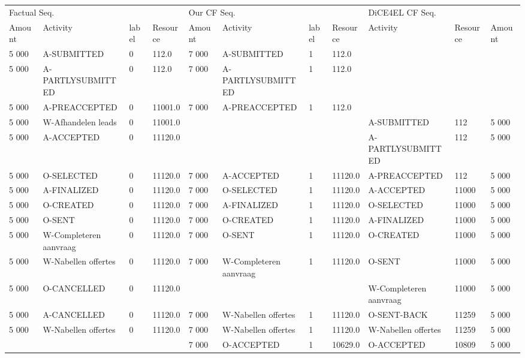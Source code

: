 \begin{tabular}{lllllllllll}
\toprule
\multicolumn{4}{l}{Factual Seq.} & \multicolumn{4}{l}{Our CF Seq.} & \multicolumn{3}{l}{DiCE4EL CF Seq.} \\
Amount & Activity & label & Resource & Amount & Activity & label & Resource & Activity & Resource & Amount \\
\midrule
5 000 & A-SUBMITTED & 0 & 112.0 & 7 000 & A-SUBMITTED & 1 & 112.0 &  &  &  \\
5 000 & A-PARTLYSUBMITTED & 0 & 112.0 & 7 000 & A-PARTLYSUBMITTED & 1 & 112.0 &  &  &  \\
5 000 & A-PREACCEPTED & 0 & 11001.0 & 7 000 & A-PREACCEPTED & 1 & 112.0 &  &  &  \\
5 000 & W-Afhandelen leads & 0 & 11001.0 &  &  &  &  & A-SUBMITTED & 112 & 5 000 \\
5 000 & A-ACCEPTED & 0 & 11120.0 &  &  &  &  & A-PARTLYSUBMITTED & 112 & 5 000 \\
5 000 & O-SELECTED & 0 & 11120.0 & 7 000 & A-ACCEPTED & 1 & 11120.0 & A-PREACCEPTED & 112 & 5 000 \\
5 000 & A-FINALIZED & 0 & 11120.0 & 7 000 & O-SELECTED & 1 & 11120.0 & A-ACCEPTED & 11000 & 5 000 \\
5 000 & O-CREATED & 0 & 11120.0 & 7 000 & A-FINALIZED & 1 & 11120.0 & O-SELECTED & 11000 & 5 000 \\
5 000 & O-SENT & 0 & 11120.0 & 7 000 & O-CREATED & 1 & 11120.0 & A-FINALIZED & 11000 & 5 000 \\
5 000 & W-Completeren aanvraag & 0 & 11120.0 & 7 000 & O-SENT & 1 & 11120.0 & O-CREATED & 11000 & 5 000 \\
5 000 & W-Nabellen offertes & 0 & 11120.0 & 7 000 & W-Completeren aanvraag & 1 & 11120.0 & O-SENT & 11000 & 5 000 \\
5 000 & O-CANCELLED & 0 & 11120.0 &  &  &  &  & W-Completeren aanvraag & 11000 & 5 000 \\
5 000 & A-CANCELLED & 0 & 11120.0 & 7 000 & W-Nabellen offertes & 1 & 11120.0 & O-SENT-BACK & 11259 & 5 000 \\
5 000 & W-Nabellen offertes & 0 & 11120.0 & 7 000 & W-Nabellen offertes & 1 & 11120.0 & W-Nabellen offertes & 11259 & 5 000 \\
 &  &  &  & 7 000 & O-ACCEPTED & 1 & 10629.0 & O-ACCEPTED & 10809 & 5 000 \\
\bottomrule
\end{tabular}

